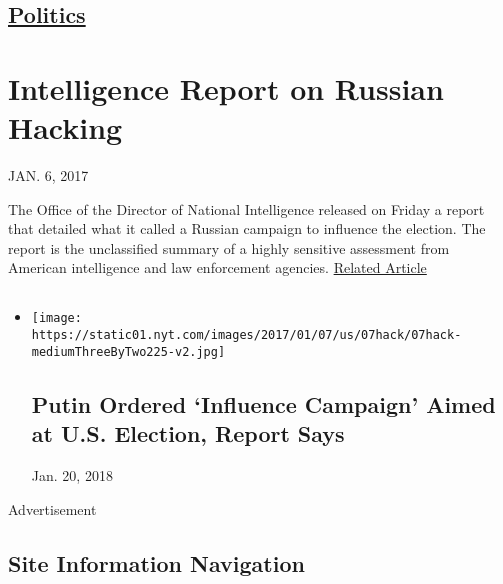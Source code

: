 \hypertarget{-politics-}{%
\subsection{\texorpdfstring{ \href{/section/politics}{Politics}
}{ Politics }}\label{-politics-}}

\hypertarget{intelligence-report-on-russian-hacking}{%
\section{Intelligence Report on Russian
Hacking}\label{intelligence-report-on-russian-hacking}}

JAN. 6, 2017

The Office of the Director of National Intelligence released on Friday a
report that detailed what it called a Russian campaign to influence the
election. The report is the unclassified summary of a highly sensitive
assessment from American intelligence and law enforcement agencies.
\href{https://www.nytimes.com/2017/01/06/us/politics/russia-hack-report.html}{Related
Article}

\hypertarget{section}{%
\subsection{}\label{section}}

\begin{itemize}
\item
  \href{https://www.nytimes.com/2017/01/06/us/politics/russia-hack-report.html}{}

  \texttt{[image: https://static01.nyt.com/images/2017/01/07/us/07hack/07hack-mediumThreeByTwo225-v2.jpg]}

  \hypertarget{putin-ordered-influence-campaign-aimed-at-us-election-report-says}{%
  \subsection{Putin Ordered `Influence Campaign' Aimed at U.S. Election,
  Report
  Says}\label{putin-ordered-influence-campaign-aimed-at-us-election-report-says}}

  Jan. 20, 2018
\end{itemize}

Advertisement

\hypertarget{site-information-navigation}{%
\subsection{Site Information
Navigation}\label{site-information-navigation}}

